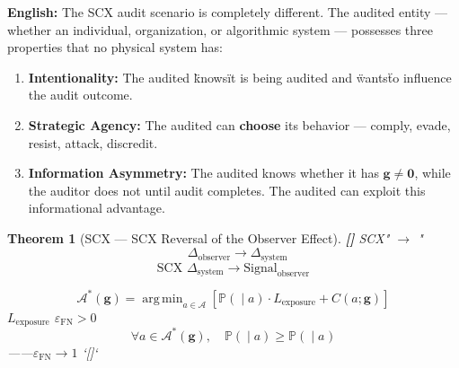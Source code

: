 \documentclass[12pt,a4paper]{article}
\newtheorem{theorem}{Theorem}[section]
\theoremstyle{remark}
\newcommand{\Pbb}{\mathbb{P}}
\newcommand{\g}{\mathbf{g}}
\DeclareMathOperator{\argmin}{arg\,min}
\newcommand{\rigorPartial}{\textnormal{\textbf{[]}}}
\begin{document}
\vspace{4pt}
\noindent
\textbf{English:} The SCX audit scenario is completely different. The audited entity — whether an individual, organization, or algorithmic system — possesses three properties that no physical system has:

\begin{enumerate}[label=(\arabic*)]
    \item \textbf{Intentionality:} The audited \"knows\" it is being audited and \"wants\" to influence the audit outcome.
    \item \textbf{Strategic Agency:} The audited can \textbf{choose} its behavior — comply, evade, resist, attack, discredit.
    \item \textbf{Information Asymmetry:} The audited knows whether it has $ \g \neq \mathbf{0} $, while the auditor does not until audit completes. The audited can exploit this informational advantage.
\end{enumerate}

\begin{theorem}[SCX — SCX Reversal of the Observer Effect]\label{thm:observer_reversal}\rigorPartial
SCX" $ \to $ "\textbf{}
\begin{equation}
    \text{ } \Delta_{\text{observer}} \xrightarrow{\text{}} \Delta_{\text{system}}
\end{equation}
\begin{equation}
    \text{SCX } \Delta_{\text{system}} \xrightarrow{\text{}} \text{Signal}_{\text{observer}}
\end{equation}

\begin{equation}
    \mathcal{A}^*(\g) = \argmin_{a \in \mathcal{A}} \left[ \Pbb(\text{} \mid a) \cdot L_{\text{exposure}} + C(a; \g) \right]
\end{equation}
 $ L_{\text{exposure}} $  $ \varepsilon_{\text{FN}} > 0 $ 
\begin{equation}
    \forall a \in \mathcal{A}^*(\g), \quad \Pbb(\text{} \mid a) \geq \Pbb(\text{} \mid a_{\text{}})
\end{equation}
——$ \varepsilon_{\text{FN}} \to 1 $ `[]`
\end{theorem}
\end{document}
